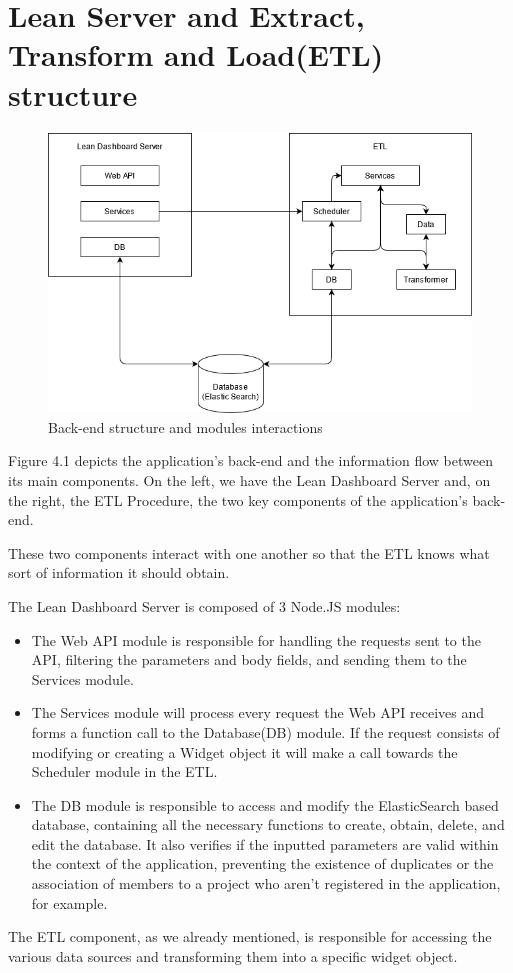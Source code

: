 \documentclass[a4paper,twoside,10pt]{report}
\begin{document}
\section{Lean Server and Extract, Transform and Load(ETL) structure}
\begin{figure}[h!]
\center
  \includegraphics[width=\textwidth]{arquitetura software.png}
  \caption{Back-end structure and modules interactions}
\end{figure}
Figure 4.1 depicts the application's back-end and the information flow between its main components. On the left, we have the Lean Dashboard Server and, on the right, the ETL Procedure, the two key components of the application's back-end.

These two components interact with one another so that the ETL knows what sort of information it should obtain.

The Lean Dashboard Server is composed of 3 Node.JS\cite{NODE} modules:
\begin{itemize}
 \item The Web API module is responsible for handling the requests sent to the API, filtering the parameters and body fields, and sending them to the Services module.
 \item The Services module will process every request the Web API receives and forms a function call to the Database(DB) module. If the request consists of modifying or creating a Widget object it will make a call towards the Scheduler module in the ETL.
 \item The DB module is responsible to access and modify the ElasticSearch based database, containing all the necessary functions to create, obtain, delete, and edit the database. It also verifies if the inputted parameters are valid within the context of the application, preventing the existence of duplicates or the association of members to a project who aren't registered in the application, for example.
\end{itemize}
\newpage
The ETL component, as we already mentioned, is responsible for accessing the various data sources and transforming them into a specific widget object.
\end{document}
